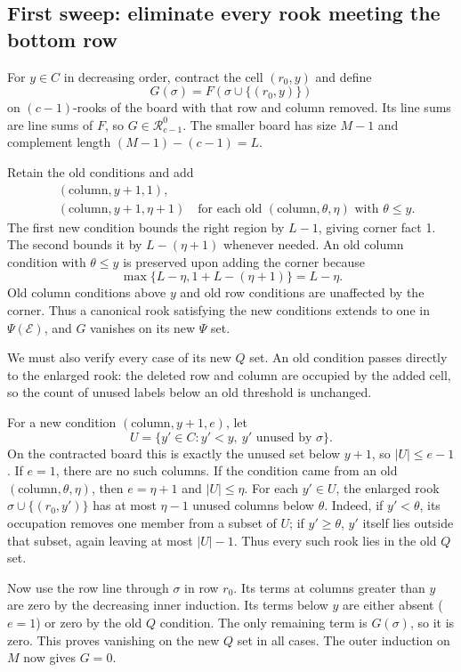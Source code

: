 \subsection{First sweep: eliminate every rook meeting the bottom row}
For $y\in C$ in decreasing order, contract the cell $(r_0,y)$ and define
\[G(\sigma)=F(\sigma\cup\{(r_0,y)\})
\]
on $(c-1)$-rooks of the board with that row and column removed. Its line sums are line sums of $F$, so $G\in \mathcal R_{c-1}^{0}$. The smaller board has size $M-1$ and complement length $(M-1)-(c-1)=L$.

Retain the old conditions and add
\begin{align*}
&(\mathrm{column},y+1,1),\\
&(\mathrm{column},y+1,\eta+1)
\quad\text{for each old }(\mathrm{column},\theta,\eta)\text{ with }\theta\le y.
\end{align*}
The first new condition bounds the right region by $L-1$, giving corner fact 1. The second bounds it by $L-(\eta+1)$ whenever needed. An old column condition with $\theta\le y$ is preserved upon adding the corner because
\[\max\{L-\eta,1+L-(\eta+1)\}=L-\eta.
\]
Old column conditions above $y$ and old row conditions are unaffected by the corner. Thus a canonical rook satisfying the new conditions extends to one in $\Psi(\mathcal E)$, and $G$ vanishes on its new $\Psi$ set.

We must also verify every case of its new $Q$ set. An old condition passes directly to the enlarged rook: the deleted row and column are occupied by the added cell, so the count of unused labels below an old threshold is unchanged.

For a new condition $(\mathrm{column},y+1,e)$, let
\[U=\{y'\in C:y'<y,\ y'\text{ unused by }\sigma\}.
\]
On the contracted board this is exactly the unused set below $y+1$, so $|U|\le e-1$. If $e=1$, there are no such columns. If the condition came from an old $(\mathrm{column},\theta,\eta)$, then $e=\eta+1$ and $|U|\le \eta$. For each $y'\in U$, the enlarged rook $\sigma\cup\{(r_0,y')\}$ has at most $\eta-1$ unused columns below $\theta$. Indeed, if $y'<\theta$, its occupation removes one member from a subset of $U$; if $y'\ge\theta$, $y'$ itself lies outside that subset, again leaving at most $|U|-1$. Thus every such rook lies in the old $Q$ set.

Now use the row line through $\sigma$ in row $r_0$. Its terms at columns greater than $y$ are zero by the decreasing inner induction. Its terms below $y$ are either absent ($e=1$) or zero by the old $Q$ condition. The only remaining term is $G(\sigma)$, so it is zero. This proves vanishing on the new $Q$ set in all cases. The outer induction on $M$ now gives $G=0$.

